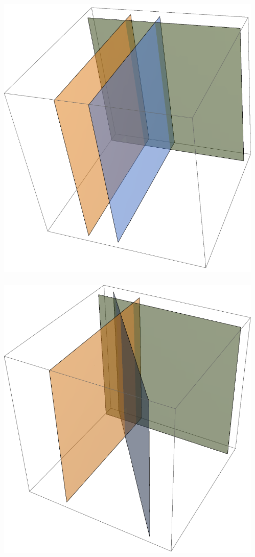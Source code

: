 \documentclass[11pt,table,final,xcolor={usenames,dvipsnames,table}]{beamer}
\begin{document}
\begin{frame}
\begin{columns}
\begin{itemize}
 \end{itemize}
   \includegraphics[width=0.4\columnwidth]{img/Rank_No-solutions1} \ \ 
   \includegraphics[width=0.4\columnwidth]{img/Rank_No-solutions2}
 \end{columns}
\end{frame}
 
\end{document}
